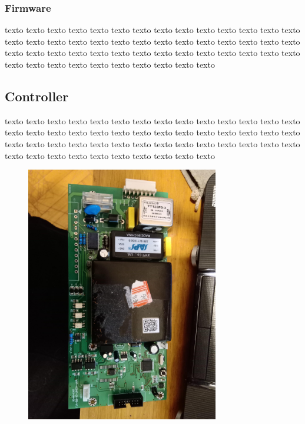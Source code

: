 \documentclass[
11pt, %
]{charter}
\begin{document}
\subsubsection{Firmware}


texto texto texto texto texto texto texto texto texto texto texto texto texto texto texto texto texto texto texto texto texto texto texto texto texto texto texto texto texto texto texto texto texto texto texto texto texto texto texto texto texto texto texto texto texto texto texto texto texto texto texto texto 
\pagebreak


\pagebreak
\subsection{Controller}


texto texto texto texto texto texto texto texto texto texto texto texto texto texto texto texto texto texto texto texto texto texto texto texto texto texto texto texto texto texto texto texto texto texto texto texto texto texto texto texto texto texto texto texto texto texto texto texto texto texto texto texto 


\begin{figure}[htpb]
\centering 
\includegraphics[width=0.75\textwidth, angle=90]{./Pics/IMG_20210523_190031.jpg}
\caption{}
\label{fig:Placa de control de repuesto.}
\end{figure}
\end{document}
